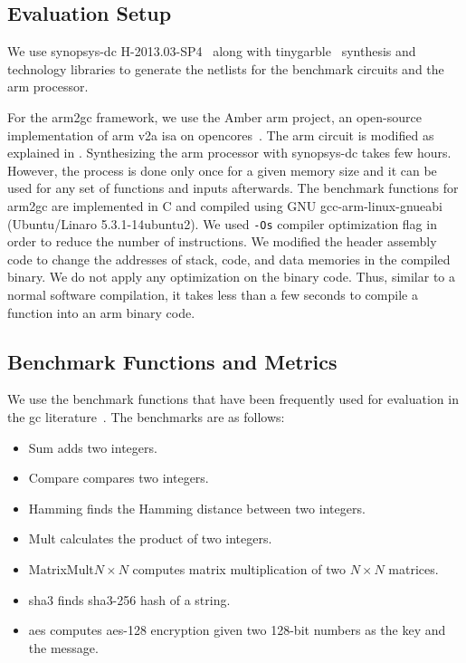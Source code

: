 \subsection{Evaluation Setup}
We use \gls{synopsys-dc} H-2013.03-SP4~\cite{tool:DesignCompiler} along with \gls{tinygarble}~\cite{songhori2015tinygarble} synthesis and technology libraries to generate the \gls{netlist}s for the benchmark circuits and the \gls{arm} processor.

For the \gls{arm2gc} framework, we use the Amber \gls{arm} project, an open-source implementation of \gls{arm} v2a \acrshort{isa} on opencores~\cite{santifort2010amber}.
The \gls{arm} circuit is modified as explained in .
Synthesizing the \gls{arm} processor with \gls{synopsys-dc} takes few hours.
However, the process is done only once for a given memory size and it can be used for any set of functions and inputs afterwards.
The benchmark functions for \gls{arm2gc} are implemented in C and compiled using GNU gcc-arm-linux-gnueabi (Ubuntu/Linaro 5.3.1-14ubuntu2).
We used \texttt{-Os} compiler optimization flag in order to reduce the number of instructions.
We modified the header assembly code to change the addresses of stack, code, and data memories in the compiled binary.
We do not apply any optimization on the binary code.
Thus, similar to a normal software compilation, it takes less than a few seconds to compile a function into an \gls{arm} binary code.

\subsection{Benchmark Functions and Metrics}
We use the benchmark functions that have been frequently used for evaluation in the \acrshort{gc} literature~\cite{holzer2012secure, songhori2015tinygarble, wang2016secure}. The benchmarks are as follows:

\begin{itemize}
\vspace{-0.06in}
\item Sum adds two integers.
\vspace{-0.1in}
\item Compare compares two integers.
\vspace{-0.1in}
\item Hamming finds the Hamming distance between two integers.
\vspace{-0.1in}
\item Mult calculates the product of two integers.
\vspace{-0.1in}
\item MatrixMult$N\times N$ computes matrix multiplication of two $N\times N$ matrices.
\vspace{-0.1in}
\item \acrshort{sha}3 finds \acrshort{sha}3-256 hash of a string.
\vspace{-0.1in}
\item \acrshort{aes} computes \acrshort{aes}-128 encryption given two 128-bit numbers as the key and the message.
\end{itemize}

